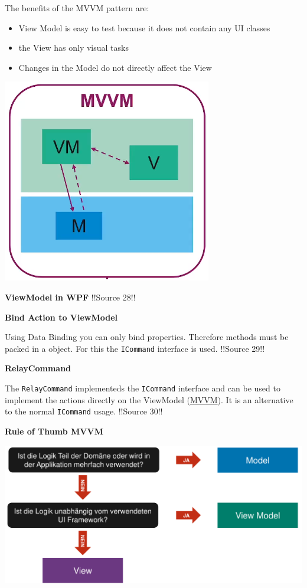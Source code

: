 \documentclass[10pt,twoside,landscape]{article}
\begin{document}
\begin{multicols}{3}
The benefits of the MVVM pattern are:
\begin{itemize}
\item View Model is easy to test because it does not contain any UI classes
\item the View has only visual tasks
\item Changes in the Model do not directly affect the View
\end{itemize}

\begin{center}
\includegraphics[width=.9\linewidth]{img/mvvm.png}
\end{center}

\textbf{ViewModel in WPF}
!!Source 28!!

\textbf{Bind Action to ViewModel}

Using Data Binding you can only bind properties.
Therefore methods must be packed in a object.
For this the \texttt{ICommand} interface is used.
!!Source 29!!

\textbf{RelayCommand}

The \texttt{RelayCommand} implementeds the \texttt{ICommand} interface and can be used to implement the actions directly on the ViewModel (\href{../../../roam/20211103140901-mvvm.org}{MVVM}).
It is an alternative to the normal \texttt{ICommand} usage.
!!Source 30!!

\textbf{Rule of Thumb MVVM}

\begin{center}
\includegraphics[width=.9\linewidth]{img/rule_of_thumb_logic_in_mvvm_.png}
\end{center}


\end{multicols}
\end{document}
